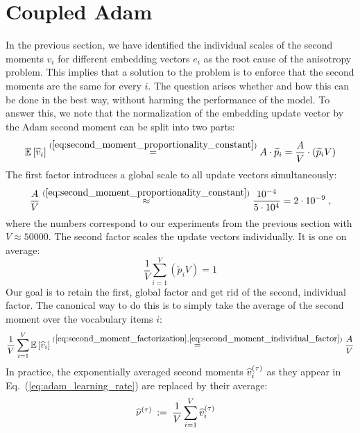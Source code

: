 \section{Coupled Adam}
\label{sec:lmwap}

In the previous section, we have identified the individual scales of the second moments $v_i$ for different embedding vectors $e_i$ as the root cause of the anisotropy problem. This implies that a solution to the problem is to enforce that the second moments are the same for every $i$.
The question arises whether and how this can be done in the best way, without harming the performance of the model.
To answer this, we note that the normalization of the embedding update vector by the Adam second moment can be split into two parts:
\begin{equation}
\mathbb{E} \left[ \widehat{v}_i \right] 
\stackrel{(\ref{eq:second_moment_proportionality_constant})}{=} A \cdot \widetilde p_i
= \frac{A}{V} \cdot \left( \widetilde p_i V \right)
\label{eq:second_moment_factorization}
\end{equation}
The first factor introduces a global scale to all update vectors simultaneously:
\begin{equation}
    \frac{A}{V} \stackrel{(\ref{eq:second_moment_proportionality_constant})}{\approx} \frac{10^{-4}}{5 \cdot 10^{4}} = 2 \cdot 10^{-9} \; ,
\label{eq:second_moment_global_factor}
\end{equation}
where the numbers correspond to our experiments from the previous section with $V \approx 50000$.
The second factor scales the update vectors individually. It is one on average:
\begin{equation}
\frac{1}{V} \sum_{i=1}^{V} \left( \widetilde p_i V \right) = 1
\label{eq:second_moment_individual_factor}
\end{equation}
Our goal is to retain the first, global factor and get rid of the second, individual factor. 
The canonical way to do this is to simply take the average of the second moment over the vocabulary items $i$:
\begin{equation}
\frac{1}{V} \sum_{i=1}^{V} \mathbb{E} \left[ \widehat{v}_i \right]
\stackrel{(\ref{eq:second_moment_factorization}, \ref{eq:second_moment_individual_factor})}{=} \frac{A}{V}
\label{eq:optimizer_update_second_moment_avg_canonical}
\end{equation}
In practice, the exponentially averaged second moments $\widehat{v}_i^{(\tau)}$ as they appear in Eq.~(\ref{eq:adam_learning_rate}) are replaced by their average:
\begin{align}
\widehat{\nu}^{(\tau)} \: &:= \: \frac{1}{V} \sum_{i=1}^V \widehat{v}_i^{(\tau)}
\label{eq:optimizer_update_second_moment_avg}
\end{align}
